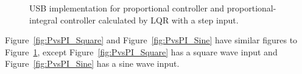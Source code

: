 \begin{figure}[!htbp]
{    \label{fig:PitchVoltage_LQR_RMSE_Step}
    }    
    \caption{USB implementation for proportional controller and proportional-integral controller calculated by LQR with a step input.}
    \label{fig:PvsPI_Step}
\end{figure}
Figure~\ref{fig:PvsPI_Square} and Figure~\ref{fig:PvsPI_Sine} have similar figures to Figure~\ref{fig:PvsPI_Step}, except Figure~\ref{fig:PvsPI_Square} has a square wave input and Figure~\ref{fig:PvsPI_Sine} has a sine wave input.
